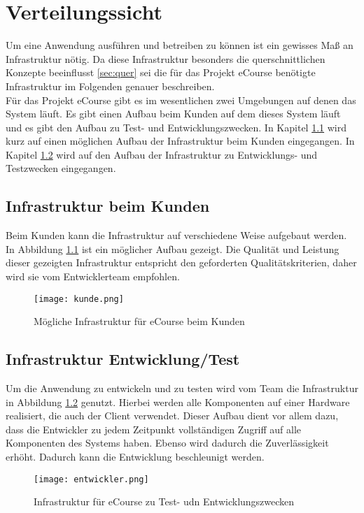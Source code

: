 \chapter{Verteilungssicht}
Um eine Anwendung ausführen und betreiben zu können ist ein gewisses Maß an Infrastruktur nötig. Da diese Infrastruktur besonders die querschnittlichen Konzepte beeinflusst \ref{sec:quer} sei die für das Projekt eCourse benötigte Infrastruktur im Folgenden genauer beschreiben. \\

Für das Projekt eCourse gibt es im wesentlichen zwei Umgebungen auf denen das System läuft. Es gibt einen Aufbau beim Kunden auf dem dieses System läuft und es gibt den Aufbau zu Test- und Entwicklungszwecken. In Kapitel \ref{sec:Kunde} wird kurz auf einen möglichen Aufbau der Infrastruktur beim Kunden eingegangen. In Kapitel \ref{sec:Entwicklung} wird auf den Aufbau der Infrastruktur zu Entwicklungs- und Testzwecken eingegangen.
\section{Infrastruktur beim Kunden}
\label{sec:Kunde}
Beim Kunden kann die Infrastruktur auf verschiedene Weise aufgebaut werden. In Abbildung \ref{fib:Kunde} ist ein möglicher Aufbau gezeigt. Die Qualität und Leistung dieser gezeigten Infrastruktur entspricht den geforderten Qualitätskriterien, daher wird sie vom Entwicklerteam empfohlen.

\begin{figure}[H]
\centering
\texttt{[image: kunde.png]}
\caption{Mögliche Infrastruktur für eCourse beim Kunden}
\label{fib:Kunde}
\end{figure}


\section{Infrastruktur Entwicklung/Test}
\label{sec:Entwicklung}
Um die Anwendung zu entwickeln und zu testen wird vom Team die Infrastruktur in Abbildung \ref{fib:Entwickler} genutzt. Hierbei werden alle Komponenten auf einer Hardware realisiert, die auch der Client verwendet. Dieser Aufbau dient vor allem dazu, dass die Entwickler zu jedem Zeitpunkt vollständigen Zugriff auf alle Komponenten des Systems haben. Ebenso wird dadurch die Zuverlässigkeit erhöht. Dadurch kann die Entwicklung beschleunigt werden.

\begin{figure}[H]
\centering
\texttt{[image: entwickler.png]}
\caption{Infrastruktur für eCourse zu Test- udn Entwicklungszwecken}
\label{fib:Entwickler}
\end{figure}